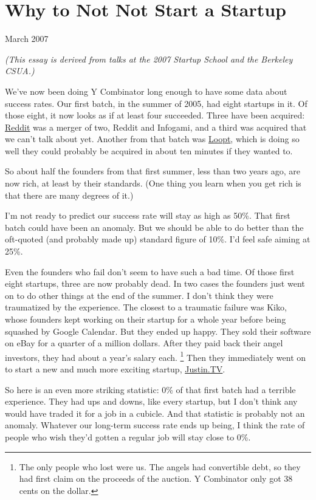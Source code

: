 \chapter{Why to Not Not Start a Startup}

March 2007

\emph{(This essay is derived from talks at the 2007 Startup School and
the Berkeley CSUA.)}

We've now been doing Y Combinator long enough to have some data about
success rates. Our first batch, in the summer of 2005, had eight
startups in it. Of those eight, it now looks as if at least four
succeeded. Three have been acquired: \href{http://reddit.com}{Reddit}
was a merger of two, Reddit and Infogami, and a third was acquired that
we can't talk about yet. Another from that batch was
\href{http://loopt.com}{Loopt}, which is doing so well they could
probably be acquired in about ten minutes if they wanted to.

So about half the founders from that first summer, less than two years
ago, are now rich, at least by their standards. (One thing you learn
when you get rich is that there are many degrees of it.)

I'm not ready to predict our success rate will stay as high as 50\%.
That first batch could have been an anomaly. But we should be able to do
better than the oft-quoted (and probably made up) standard figure of
10\%. I'd feel safe aiming at 25\%.

Even the founders who fail don't seem to have such a bad time. Of those
first eight startups, three are now probably dead. In two cases the
founders just went on to do other things at the end of the summer. I
don't think they were traumatized by the experience. The closest to a
traumatic failure was Kiko, whose founders kept working on their startup
for a whole year before being squashed by Google Calendar. But they
ended up happy. They sold their software on eBay for a quarter of a
million dollars. After they paid back their angel investors, they had
about a year's salary each. \footnote{The only people who lost were us. The angels had convertible
debt, so they had first claim on the proceeds of the auction. Y
Combinator only got 38 cents on the dollar.} Then they
immediately went on to start a new and much more exciting startup,
\href{http://justin.tv}{Justin.TV}.

So here is an even more striking statistic: 0\% of that first batch had
a terrible experience. They had ups and downs, like every startup, but I
don't think any would have traded it for a job in a cubicle. And that
statistic is probably not an anomaly. Whatever our long-term success
rate ends up being, I think the rate of people who wish they'd gotten a
regular job will stay close to 0\%.

